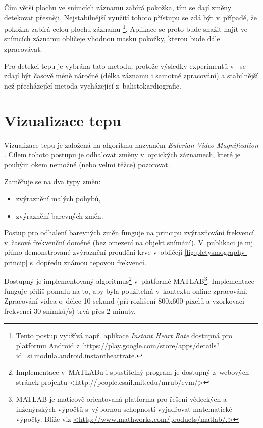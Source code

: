 \documentclass[
  digital, %
  table,   %
%
  lof,     %
  lot,     %
]{fithesis3}
\begin{document}
Čím větší plochu ve snímcích záznamu zabírá pokožka, tím se dají změny detekovat přesněji. Nejstabilnější využití tohoto přístupu se zdá být v~případě, že pokožka zabírá celou plochu záznamu 
\footnote{Tento postup využívá např. aplikace \emph{Instant Heart Rate} dostupná pro platformu Android z~\url{https://play.google.com/store/apps/details?id=si.modula.android.instantheartrate}.}. Aplikace se proto 
bude snažit najít ve snímcích záznamu obličeje vhodnou masku pokožky, kterou bude dále zpracovávat.

Pro detekci tepu je vybrána tato metodu, protože výsledky experimentů v~\cite{remote-plethysmographic} se zdají být časově méně náročné (délka záznamu i samotné zpracování) a stabilnější než přecházející metoda vycházející z~balistokardiografie.

\section {Vizualizace tepu} 
Vizualizace tepu je založená na algoritmu nazvaném \emph{Eulerian Video Magnification} \cite{eulerian-magnification}. Cílem tohoto postupu je odhalovat změny v~optických záznamech, které je pouhým okem nemožné (nebo velmi těžce) pozorovat. 

Zaměřuje se na dva typy změn:
\begin{itemize}
  \item zvýraznění malých pohybů,
    \item zvýraznění barevných změn.
\end{itemize}

Postup pro odhalení barevných změn funguje na principu zvýrazňování frekvencí v~časové frekvenční doméně (bez omezení na objekt snímání). V~publikaci je mj. přímo demonstrované zvýraznění proudění krve v~obličeji \ref{fig:pletysmography-princip} s~dopředu známou tepovou frekvencí.

Dostupný je implementovaný algoritmus\footnote{Implementace v~MATLABu i spustitelný program je dostupný z~webových stránek projektu \url{<http://people.csail.mit.edu/mrub/evm/>}} v~platformě MATLAB\footnote{MATLAB je maticově orientovaná platforma pro řešení vědeckých a inženýrských výpočtů s~výbornou schopností vyjadřovat matematické výpočty. Blíže viz \url{<http://www.mathworks.com/products/matlab/.>}}. Implementace funguje příliš pomalu na to, aby byla použitelná v~kontextu online zpracování. Zpracování videa o~délce 10 sekund (při rozlišení 800x600 pixelů a vzorkovací frekvenci 30 snímků/s) trvá přes 2 minuty. 
\end{document}
